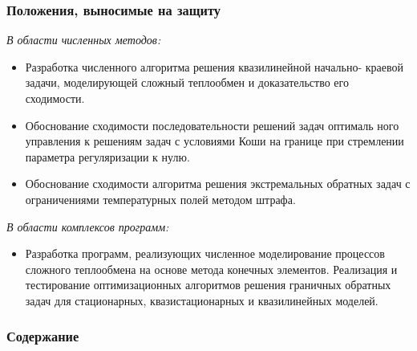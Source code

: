 \begin{frame}
    \frametitle{Положения, выносимые на защиту}
    \textit{В области численных методов:}
    \begin{itemize}
        \item Разработка численного алгоритма решения квазилинейной начально-
        краевой задачи, моделирующей сложный теплообмен и доказательство
        его сходимости.
        \item Обоснование сходимости последовательности решений задач оптималь
ного управления к решениям задач с условиями Коши на границе при
стремлении параметра регуляризации к нулю.
        \item Обоснование сходимости алгоритма решения экстремальных обратных
задач с ограничениями температурных полей методом штрафа.
    \end{itemize}

    \textit{В области комплексов программ:}
    \begin{itemize}
        \item  Разработка программ, реализующих численное моделирование процессов
        сложного теплообмена на основе метода конечных элементов.
        Реализация и тестирование оптимизационных алгоритмов решения
        граничных обратных задач для стационарных, квазистационарных и
        квазилинейных моделей.
    \end{itemize}
\end{frame}

\begin{frame}
    \frametitle{Содержание}
    \tableofcontents
\end{frame}
